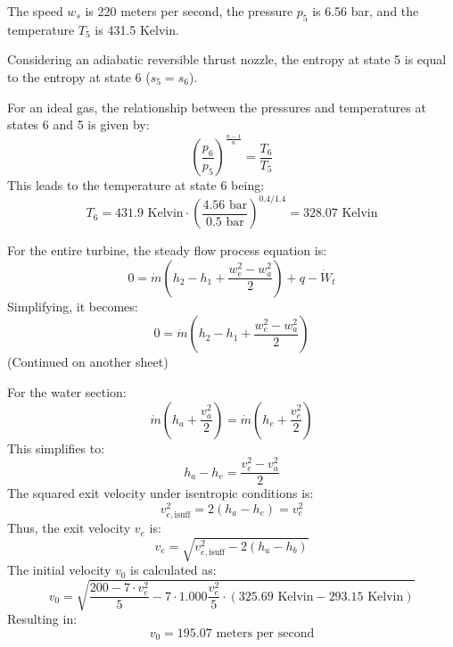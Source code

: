 The speed \( w_s \) is 220 meters per second, the pressure \( p_5 \) is 6.56 bar, and the temperature \( T_5 \) is 431.5 Kelvin.

Considering an adiabatic reversible thrust nozzle, the entropy at state 5 is equal to the entropy at state 6 (\( s_5 = s_6 \)).

For an ideal gas, the relationship between the pressures and temperatures at states 6 and 5 is given by:
\[
\left( \frac{p_6}{p_5} \right)^{\frac{n-1}{n}} = \frac{T_6}{T_5}
\]
This leads to the temperature at state 6 being:
\[
T_6 = 431.9 \text{ Kelvin} \cdot \left( \frac{4.56 \text{ bar}}{0.5 \text{ bar}} \right)^{0.4/1.4} = 328.07 \text{ Kelvin}
\]

For the entire turbine, the steady flow process equation is:
\[
0 = \dot{m} (h_2 - h_1 + \frac{w_e^2 - w_a^2}{2}) + q - \dot{W}_t
\]
Simplifying, it becomes:
\[
0 = \dot{m} (h_2 - h_1 + \frac{w_e^2 - w_a^2}{2})
\]
(Continued on another sheet)

For the water section:
\[
\dot{m}(h_a + \frac{v_a^2}{2}) = \dot{m} (h_e + \frac{v_e^2}{2})
\]
This simplifies to:
\[
h_a - h_e = \frac{v_e^2 - v_a^2}{2}
\]
The squared exit velocity under isentropic conditions is:
\[
v_{e, \text{isuff}}^2 = 2(h_a - h_e) = v_e^2
\]
Thus, the exit velocity \( v_e \) is:
\[
v_e = \sqrt{v_{e, \text{isuff}}^2 - 2(h_a - h_b)}
\]
The initial velocity \( v_0 \) is calculated as:
\[
v_0 = \sqrt{\frac{200 - 7 \cdot v_e^2}{5} - 7 \cdot 1.000 \frac{v_e^2}{5} \cdot (325.69 \text{ Kelvin} - 293.15 \text{ Kelvin})}
\]
Resulting in:
\[
v_0 = 195.07 \text{ meters per second}
\]